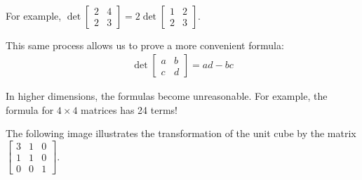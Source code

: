 \begin{applicationActivities}{2}{26}
\begin{activity}{10}
\ \\

  For example, $\det \begin{bmatrix} 2 & 4 \\ 2 & 3 \end{bmatrix} = 2 \det \begin{bmatrix} 1 & 2 \\ 2 & 3 \end{bmatrix}$.

\end{activity}

\begin{fact}
  This same process allows us to prove a more convenient formula:
    \begin{align*}
    \det\begin{bmatrix} a & b \\ c & d \end{bmatrix} = ad-bc
    \end{align*}

In higher dimensions, the formulas become unreasonable.  For example, the formula for $4\times4$ matrices has 24 terms!
\end{fact}


\begin{activity}{5}
  The following image illustrates the transformation of the unit cube
  by the matrix
  $\begin{bmatrix} 3 & 1 & 0 \\  1 & 1 & 0 \\  0 & 0 & 1\end{bmatrix}$.

  \begin{center}
\end{center}
\end{activity}
\end{applicationActivities}
